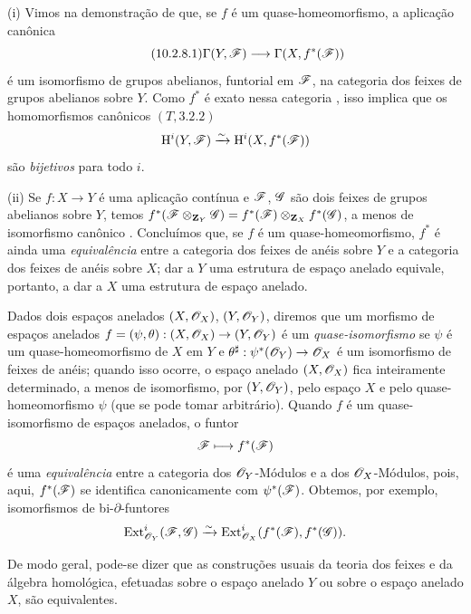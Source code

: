 \begin{remarks}[10.2.8]
\label{IV.10.2.8}
(i) Vimos na demonstração de  que, se $f$ é um quase-homeomorfismo, a aplicação canônica
\begin{equation}
\label{IV.10.2.8.1}
\tag{10.2.8.1}
\Gamma(Y,\sh{F})\to\Gamma(X,f^*(\sh{F}))
\end{equation}
é um isomorfismo de grupos abelianos, funtorial em $\mathscr{F}$, na categoria dos feixes de grupos abelianos sobre $Y$.
Como $f^*$ é exato nessa categoria , isso implica que os homomorfismos canônicos $(T,3.2.2)$
\[
  \mathrm{H}^i(Y,\mathscr{F})\xrightarrow{\sim}\mathrm{H}^i(X,f^*(\mathscr{F}))
\]
são \emph{bijetivos} para todo $i$.

(ii) Se $f:X\to Y$ é uma aplicação contínua e $\mathscr{F}$, $\mathscr{G}$ são dois feixes de grupos abelianos sobre $Y$, temos $f^*(\mathscr{F}\otimes_{\mathbf{Z}_Y}\mathscr{G})=f^*(\mathscr{F})\otimes_{\mathbf{Z}_X}f^*(\mathscr{G})$, a menos de isomorfismo canônico .
Concluímos que, se $f$ é um quase-homeomorfismo, $f^*$ é ainda uma \emph{equivalência} entre a categoria dos feixes de anéis sobre $Y$ e a categoria dos feixes de anéis sobre $X$; dar a $Y$ uma estrutura de espaço anelado equivale, portanto, a dar a $X$ uma estrutura de espaço anelado.

Dados dois espaços anelados $(X,\mathscr{O}_X)$, $(Y,\mathscr{O}_Y)$, diremos que um morfismo de espaços anelados $f=(\psi,\theta):(X,\sh{O}_X)\to(Y,\sh{O}_Y)$ é um \emph{quase-isomorfismo} se $\psi$ é um quase-homeomorfismo de $X$ em $Y$ e $\theta^\sharp:\psi^*(\sh{O}_Y)\to\sh{O}_X$ é um isomorfismo de feixes de anéis; quando isso ocorre, o espaço anelado $(X,\mathscr{O}_X)$ fica inteiramente determinado, a menos de isomorfismo, por $(Y,\mathscr{O}_Y)$, pelo espaço $X$ e pelo quase-homeomorfismo $\psi$ (que se pode tomar arbitrário).
Quando $f$ é um quase-isomorfismo de espaços anelados, o funtor
\[
  \sh{F}\mapsto f^*(\sh{F})
\]
é uma \emph{equivalência} entre a categoria dos $\mathscr{O}_Y$-Módulos e a dos $\mathscr{O}_X$-Módulos, pois, aqui, $f^*(\mathscr{F})$ se identifica canonicamente com $\psi^*(\mathscr{F})$.
Obtemos, por exemplo, isomorfismos de bi-$\partial$-funtores
\[
  \operatorname{Ext}^i_{\mathscr{O}_Y}(\mathscr{F},\mathscr{G})\xrightarrow{\sim}\operatorname{Ext}^i_{\mathscr{O}_X}(f^*(\mathscr{F}),f^*(\mathscr{G})).
\]

De modo geral, pode-se dizer que as construções usuais da teoria dos feixes e da álgebra homológica, efetuadas sobre o espaço anelado $Y$ ou sobre o espaço anelado $X$, são equivalentes.
\end{remarks}

